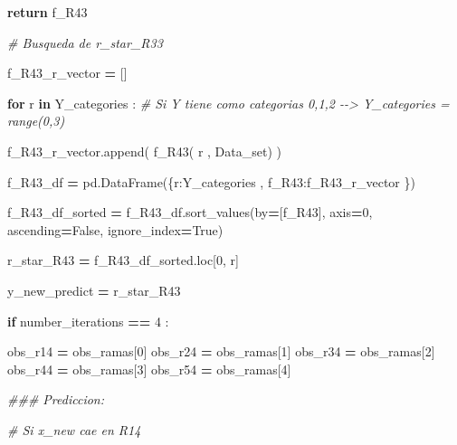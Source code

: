 \documentclass[
  11pt,
  a4paper,
]{article}
\newenvironment{Shaded}{\begin{snugshade}}{\end{snugshade}}
\newcommand{\CommentTok}[1]{\textcolor[rgb]{0.56,0.35,0.01}{\textit{#1}}}
\newcommand{\ControlFlowTok}[1]{\textcolor[rgb]{0.13,0.29,0.53}{\textbf{#1}}}
\newcommand{\DecValTok}[1]{\textcolor[rgb]{0.00,0.00,0.81}{#1}}
\newcommand{\KeywordTok}[1]{\textcolor[rgb]{0.13,0.29,0.53}{\textbf{#1}}}
\newcommand{\NormalTok}[1]{#1}
\newcommand{\OperatorTok}[1]{\textcolor[rgb]{0.81,0.36,0.00}{\textbf{#1}}}
\newcommand{\StringTok}[1]{\textcolor[rgb]{0.31,0.60,0.02}{#1}}
\newcommand{\VariableTok}[1]{\textcolor[rgb]{0.00,0.00,0.00}{#1}}
\begin{document}
\begin{Shaded}
\begin{Highlighting}[]
                        \ControlFlowTok{return}\NormalTok{ f\_R43}

                
            \CommentTok{\# Busqueda de r\_star\_R33}

\NormalTok{                f\_R43\_r\_vector }\OperatorTok{=}\NormalTok{ []}

                \ControlFlowTok{for}\NormalTok{ r }\KeywordTok{in}\NormalTok{ Y\_categories :  }\CommentTok{\# Si Y tiene como categorias 0,1,2 {-}{-}\textgreater{} Y\_categories = range(0,3)}

\NormalTok{                    f\_R43\_r\_vector.append( f\_R43( r , Data\_set) )}

\NormalTok{                f\_R43\_df }\OperatorTok{=}\NormalTok{ pd.DataFrame(\{}\StringTok{\textquotesingle{}r\textquotesingle{}}\NormalTok{:Y\_categories  , }\StringTok{\textquotesingle{}f\_R43\textquotesingle{}}\NormalTok{:f\_R43\_r\_vector \})}
        
\NormalTok{                f\_R43\_df\_sorted }\OperatorTok{=}\NormalTok{ f\_R43\_df.sort\_values(by}\OperatorTok{=}\NormalTok{[}\StringTok{\textquotesingle{}f\_R43\textquotesingle{}}\NormalTok{], axis}\OperatorTok{=}\DecValTok{0}\NormalTok{, ascending}\OperatorTok{=}\VariableTok{False}\NormalTok{, ignore\_index}\OperatorTok{=}\VariableTok{True}\NormalTok{)}

\NormalTok{                r\_star\_R43 }\OperatorTok{=}\NormalTok{ f\_R43\_df\_sorted.loc[}\DecValTok{0}\NormalTok{, }\StringTok{\textquotesingle{}r\textquotesingle{}}\NormalTok{]}


\NormalTok{                y\_new\_predict }\OperatorTok{=}\NormalTok{ r\_star\_R43}


    
    \ControlFlowTok{if}\NormalTok{ number\_iterations }\OperatorTok{==} \DecValTok{4}\NormalTok{ :}

\NormalTok{            obs\_r14 }\OperatorTok{=}\NormalTok{ obs\_ramas[}\DecValTok{0}\NormalTok{]}
\NormalTok{            obs\_r24 }\OperatorTok{=}\NormalTok{ obs\_ramas[}\DecValTok{1}\NormalTok{]}
\NormalTok{            obs\_r34 }\OperatorTok{=}\NormalTok{ obs\_ramas[}\DecValTok{2}\NormalTok{]}
\NormalTok{            obs\_r44 }\OperatorTok{=}\NormalTok{ obs\_ramas[}\DecValTok{3}\NormalTok{]}
\NormalTok{            obs\_r54 }\OperatorTok{=}\NormalTok{ obs\_ramas[}\DecValTok{4}\NormalTok{]}


         \CommentTok{\#\#\# Prediccion:}

            \CommentTok{\# Si x\_new cae en R14}


\end{Highlighting}
\end{Shaded}
\end{document}
